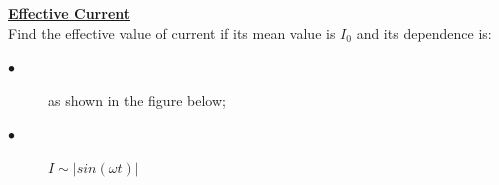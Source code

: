 \documentclass[a4paper]{article}
\begin{document}
	\Problem
	\textbf{\underline{Effective Current}}
	\\
	Find the effective value of current if its mean value is $I_0$ and its dependence is:
	\begin{description}
		\item[$\bullet$] as shown in the figure below;
		\item[$\bullet$] $I \sim \lvert sin(\omega t) \rvert$
	\end{description}
	
	
	
	
	
\end{document}

